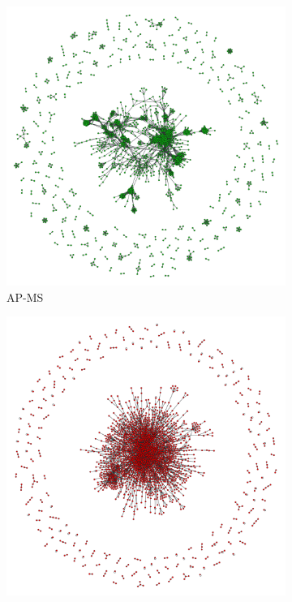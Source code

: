 \begin{figure}[!ht]
    \centering
    \begin{subfigure}[b]{0.4\columnwidth}
        \includegraphics[width=\textwidth]{./schemes/yeast_AP-MS-txt.pdf}
        \caption{\label{fig:ap_ms} AP-MS}
    \end{subfigure}
    \begin{subfigure}[b]{0.4\columnwidth}
        \includegraphics[width=\textwidth]{./schemes/yeast_Y2H-txt.pdf}

\end{subfigure}
\end{figure}
